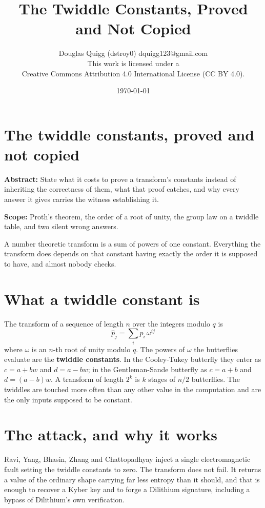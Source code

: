 \documentclass{article}
\title{The Twiddle Constants, Proved and Not Copied}
\author{Douglas Quigg (dstroy0) \small dquigg123@gmail.com \\ 
\small This work is licensed under a \\ 
\small Creative Commons Attribution 4.0 International License (CC BY 4.0). 
\small \date{\today}}
\begin{document}
\maketitle

\section{The twiddle constants, proved and not copied}
\textbf{Abstract:} State what it costs to prove a transform's constants instead of inheriting the correctness of them, what that proof catches, and why every answer it gives carries the witness establishing it.


\textbf{Scope:} Proth's theorem, the order of a root of unity, the group law on a twiddle table, and two silent wrong answers.	

A number theoretic transform is a sum of powers of one constant. Everything the transform does depends on that constant having exactly the order it is supposed to have, and almost nobody checks.

\section{What a twiddle constant is}

The transform of a sequence of length \(n\) over the integers modulo \(q\) is
\[
\hat{p}_j = \sum_i p_i \, \omega^{ij}
\]
where \(\omega\) is an \(n\)-th root of unity modulo \(q\). The powers of \(\omega\) the butterflies evaluate are the \textbf{twiddle constants}. In the Cooley-Tukey butterfly they enter as \(c = a + bw\) and \(d = a - bw\); in the Gentleman-Sande butterfly as \(c = a + b\) and \(d = (a-b)w\). A transform of length \(2^k\) is \(k\) stages of \(n/2\) butterflies. The twiddles are touched more often than any other value in the computation and are the only inputs supposed to be constant.

\section{The attack, and why it works}

Ravi, Yang, Bhasin, Zhang and Chattopadhyay inject a single electromagnetic fault setting the twiddle constants to zero. The transform does not fail. It returns a value of the ordinary shape carrying far less entropy than it should, and that is enough to recover a Kyber key and to forge a Dilithium signature, including a bypass of Dilithium's own verification.
\end{document}
